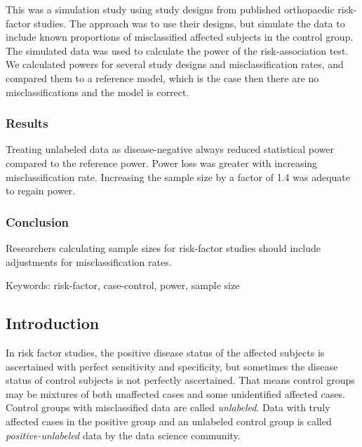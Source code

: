 \documentclass[
]{article}
\begin{document}
This was a simulation study using study designs from published
orthopaedic risk-factor studies. The approach was to use their designs,
but simulate the data to include known proportions of misclassified
affected subjects in the control group. The simulated data was used to
calculate the power of the risk-association test. We calculated powers
for several study designs and misclassification rates, and compared them
to a reference model, which is the case then there are no
misclassifications and the model is correct.

\hypertarget{results}{%
\subsubsection{Results}\label{results}}

Treating unlabeled data as disease-negative always reduced statistical
power compared to the reference power. Power loss was greater with
increasing misclassification rate. Increasing the sample size by a
factor of 1.4 was adequate to regain power.

\hypertarget{conclusion}{%
\subsubsection{Conclusion}\label{conclusion}}

Researchers calculating sample sizes for risk-factor studies should
include adjustments for misclassification rates.

Keywords: risk-factor, case-control, power, sample size

\newpage

\hypertarget{introduction}{%
\subsection{Introduction}\label{introduction}}

In risk factor studies, the positive disease status of the affected
subjects is ascertained with perfect sensitivity and specificity, but
sometimes the disease status of control subjects is not perfectly
ascertained. That means control groups may be mixtures of both
unaffected cases and some unidentified affected cases. Control groups
with misclassified data are called \emph{unlabeled}. Data with truly
affected cases in the positive group and an unlabeled control group is
called \emph{positive-unlabeled} data by the data science community.
\end{document}
